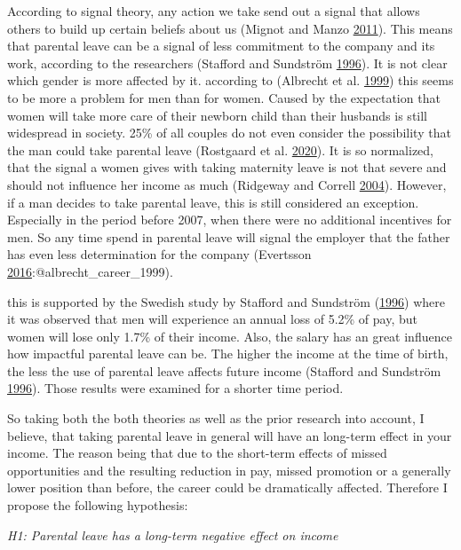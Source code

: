 \documentclass[
  12pt,
]{article}
\begin{document}
According to signal theory, any action we take send out a signal that allows others to build up certain beliefs about us (Mignot and Manzo \protect\hyperlink{ref-mignot_peter_2011}{2011}). This means that parental leave can be a signal of less commitment to the company and its work, according to the researchers (Stafford and Sundström \protect\hyperlink{ref-stafford_time_1996}{1996}). It is not clear which gender is more affected by it. according to (Albrecht et al. \protect\hyperlink{ref-albrecht_career_1999}{1999}) this seems to be more a problem for men than for women. Caused by the expectation that women will take more care of their newborn child than their husbands is still widespread in society. 25\% of all couples do not even consider the possibility that the man could take parental leave (Rostgaard et al. \protect\hyperlink{ref-rostgaard_parental_2020}{2020}). It is so normalized, that the signal a women gives with taking maternity leave is not that severe and should not influence her income as much (Ridgeway and Correll \protect\hyperlink{ref-ridgeway_unpacking_2004}{2004}). However, if a man decides to take parental leave, this is still considered an exception. Especially in the period before 2007, when there were no additional incentives for men. So any time spend in parental leave will signal the employer that the father has even less determination for the company (Evertsson \protect\hyperlink{ref-evertsson_parental_2016}{2016}:@albrecht\_career\_1999).

this is supported by the Swedish study by Stafford and Sundström (\protect\hyperlink{ref-stafford_time_1996}{1996}) where it was observed that men will experience an annual loss of 5.2\% of pay, but women will lose only 1.7\% of their income. Also, the salary has an great influence how impactful parental leave can be. The higher the income at the time of birth, the less the use of parental leave affects future income (Stafford and Sundström \protect\hyperlink{ref-stafford_time_1996}{1996}). Those results were examined for a shorter time period.

So taking both the both theories as well as the prior research into account, I believe, that taking parental leave in general will have an long-term effect in your income. The reason being that due to the short-term effects of missed opportunities and the resulting reduction in pay, missed promotion or a generally lower position than before, the career could be dramatically affected.
Therefore I propose the following hypothesis:

\emph{H1: Parental leave has a long-term negative effect on income}
\end{document}
